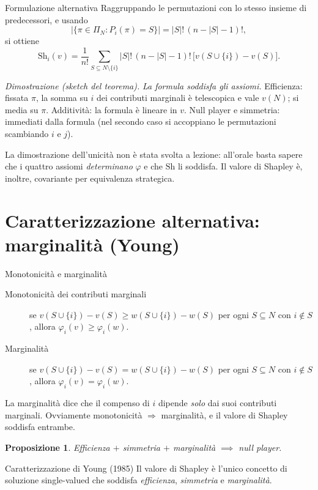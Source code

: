 \documentclass[12pt,a4paper,twoside]{book}
\theoremstyle{plain}
\newtheorem{proposition}[theorem]{Proposizione}
\theoremstyle{definition}
\newcommand{\Sh}{\mathrm{Sh}}
\begin{document}
\begin{defbox}{Formulazione alternativa}
Raggruppando le permutazioni con lo stesso insieme di predecessori, e usando
\[
  \bigl|\{\pi\in\Pi_N: P_i(\pi)=S\}\bigr| = |S|!\,(n-|S|-1)!,
\]
si ottiene
\[
  \Sh_i(v)=\frac{1}{n!}\sum_{S\subseteq N\setminus\{i\}}|S|!\,(n-|S|-1)!\,\bigl[v(S\cup\{i\})-v(S)\bigr].
\]
\end{defbox}

\textit{Dimostrazione (sketch del teorema).}
\emph{La formula soddisfa gli assiomi.} Efficienza: fissata $\pi$, la somma su $i$
dei contributi marginali è telescopica e vale $v(N)$; si media su $\pi$.
Additività: la formula è lineare in $v$. Null player e simmetria: immediati dalla
formula (nel secondo caso si accoppiano le permutazioni scambiando $i$ e $j$).

La dimostrazione dell'unicità non è stata svolta a lezione: all'orale basta
sapere che i quattro assiomi \emph{determinano} $\varphi$ e che $\Sh$ li soddisfa.
Il valore di Shapley è, inoltre, covariante per equivalenza strategica.

\section{Caratterizzazione alternativa: marginalità (Young)}

\begin{defbox}{Monotonicità e marginalità}
\begin{description}
  \item[Monotonicità dei contributi marginali] se
        $v(S\cup\{i\})-v(S)\ge w(S\cup\{i\})-w(S)$ per ogni $S\subseteq N$ con
        $i\notin S$, allora $\varphi_i(v)\ge\varphi_i(w)$.
  \item[Marginalità] se $v(S\cup\{i\})-v(S)= w(S\cup\{i\})-w(S)$ per ogni
        $S\subseteq N$ con $i\notin S$, allora $\varphi_i(v)=\varphi_i(w)$.
\end{description}
La marginalità dice che il compenso di $i$ dipende \emph{solo} dai suoi
contributi marginali. Ovviamente monotonicità $\Rightarrow$ marginalità, e il
valore di Shapley soddisfa entrambe.
\end{defbox}

\begin{proposition}
Efficienza $+$ simmetria $+$ marginalità $\implies$ null player.
\end{proposition}

\begin{thmbox}{Caratterizzazione di Young (1985)}
Il valore di Shapley è l'unico concetto di soluzione single-valued che soddisfa
\emph{efficienza}, \emph{simmetria} e \emph{marginalità}.
\end{thmbox}
\end{document}

